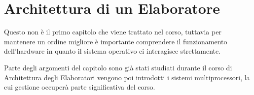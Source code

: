 \chapter{Architettura di un Elaboratore}

Questo non è il primo capitolo che viene trattato nel corso, tuttavia per mantenere un ordine migliore è importante comprendere il funzionamento dell'hardware in quanto il sistema operativo ci interagisce strettamente.

Parte degli argomenti del capitolo sono già stati studiati durante il corso di Architettura degli Elaboratori vengono poi introdotti i sistemi multiprocessori, la cui gestione occuperà parte significativa del corso.








